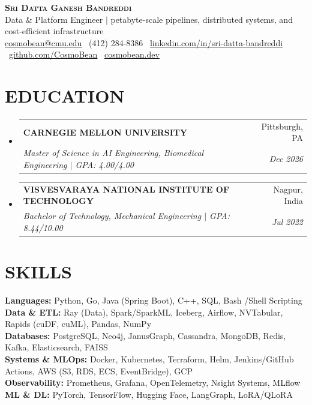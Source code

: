 \documentclass[letterpaper,10pt]{article}
\makeatletter
\newcommand{\resumespaceoutertop}{2pt}
\newcommand{\resumeitemsep}{0pt}
\newcommand{\resumesmallgap}{1pt}
\newcommand{\resumeskillsgap}{2pt}
\newcommand{\resumeEducationSubheading}[4]{
  \item
    \begin{tabular*}{\linewidth}[t]{l@{\extracolsep{\fill}}r}
      \textbf{#1} & #2 \\
      \textit{\small#3} & \textit{\small #4} \\
    \end{tabular*}
}
\newcommand{\resumeSubHeadingListStart}{%
  \begin{itemize}[leftmargin=0in, label={}, itemsep=\resumeitemsep, topsep=\resumespaceoutertop, parsep=0pt, partopsep=0pt]}
\newcommand{\resumeSubHeadingListEnd}{\end{itemize}}
\makeatother
\begin{document}
\begin{center}
    \textbf{\LARGE \scshape Sri Datta Ganesh Bandreddi} \\ \vspace{2pt}
    {\small Data \& Platform Engineer $|$ petabyte-scale pipelines, distributed systems, and cost-efficient infrastructure} \\ \vspace{\resumeskillsgap}
    \small \href{mailto:cosmobean@cmu.edu}{\underline{cosmobean@cmu.edu}}
    \textbullet\ (412) 284-8386 \textbullet\
    \href{http://linkedin.com/in/sri-datta-bandreddi}{\underline{linkedin.com/in/sri-datta-bandreddi}}
    \textbullet\ \href{https://github.com/CosmoBean}{\underline{github.com/CosmoBean}}
    \textbullet\ \href{https://cosmobean.dev}{\underline{cosmobean.dev}}
\end{center}

\section{EDUCATION}
  \resumeSubHeadingListStart
    \resumeEducationSubheading
      {CARNEGIE MELLON UNIVERSITY}{Pittsburgh, PA}
      {Master of Science in AI Engineering, Biomedical Engineering $|$ \textup{GPA: 4.00/4.00}}{Dec 2026}
    \vspace{\resumesmallgap}
    \resumeEducationSubheading
      {VISVESVARAYA NATIONAL INSTITUTE OF TECHNOLOGY}{Nagpur, India}
      {Bachelor of Technology, Mechanical Engineering $|$ \textup{GPA: 8.44/10.00}}{Jul 2022}
  \resumeSubHeadingListEnd

\section{SKILLS}
{\small
\noindent \textbf{Languages:} Python, Go, Java (Spring Boot), C++, SQL, Bash /Shell Scripting \\
\textbf{Data \& ETL:} Ray (Data), Spark/SparkML, Iceberg, Airflow, NVTabular, Rapids (cuDF, cuML), Pandas, NumPy \\
\textbf{Databases:} PostgreSQL, Neo4j, JanusGraph, Cassandra, MongoDB, Redis, Kafka, Elasticsearch, FAISS \\
\textbf{Systems \& MLOps:} Docker, Kubernetes, Terraform, Helm, Jenkins/GitHub Actions, AWS (S3, RDS, ECS, EventBridge), GCP \\
\textbf{Observability:} Prometheus, Grafana, OpenTelemetry, Nsight Systems, MLflow \\
\textbf{ML \& DL:} PyTorch, TensorFlow, Hugging Face, LangGraph, LoRA/QLoRA
\par}
\vspace{\resumeskillsgap}
\end{document}
